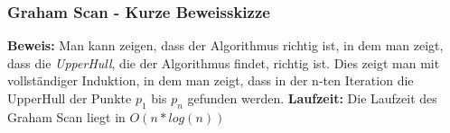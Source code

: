 \begin{frame}
	\frametitle{{Graham Scan - Kurze Beweisskizze}}
\textbf{Beweis:}
Man kann zeigen, dass der Algorithmus richtig ist, in dem man zeigt, dass die \textit{UpperHull}, die der Algorithmus findet, richtig ist.\newline \newline
Dies zeigt man mit vollständiger Induktion, in dem man zeigt, dass in der n-ten Iteration die UpperHull der Punkte $p_1$ bis $p_n$ gefunden werden.
\newline
\newline
\pause
\textbf{Laufzeit:}
Die Laufzeit des Graham Scan liegt in $O(n * log (n))$
\end{frame}
